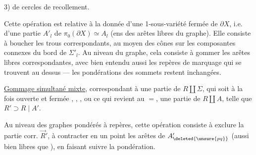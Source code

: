 
3)   de cercles de recollement.

Cette opération est relative à la donnée d'une 1-sous-variété fermée de $\partial X$, i.e. d'une partie $A'_l$ de $\pi_0(\partial X)\simeq A_l$ (ens des arêtes libres du graphe).
Elle consiste à boucher les trous correspondants, au moyen des cônes sur les composantes connexes du bord de $\Sigma'_l$.
Au niveau du graphe, cela consiste à gommer les arêtes libres correspondantes, avec bien entendu aussi les repères de marquage qui se trouvent au dessus ---  les pondérations des sommets restent inchangées.

\uline{Gommage simultané mixte},  correspondant à une partie
   de $R\amalg\Sigma$,
qui soit à la fois ouverte et fermée 
,
,
,
ou ce qui revient au $=$, une partie  de $R\amalg A$, telle que $R'\supset R\mid A'$.

Au niveau des graphes pondérés à repères, cette opération consiste à exclure   la partie corr. $\vec R'$, à contracter en un point les arêtes de $A'_{\deleted{\unsure{pq}}}$ (aussi bien libres que ), en faisant suivre la pondération.

